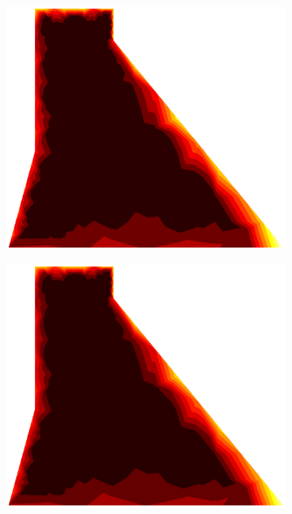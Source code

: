 \documentclass[10pt, a4paper]{article}
\begin{document}
\begin{figure}[H]
\begin{subfigure}[H]{0.19\textwidth}
		\includegraphics[width=1.2\textwidth]{fig/6.eps}
	\end{subfigure}
	\begin{subfigure}[H]{0.19\textwidth}
		\includegraphics[width=1.2\textwidth]{fig/7.eps}
	\end{subfigure}
	\begin{subfigure}[H]{0.19\textwidth}

\end{subfigure}
\end{figure}
\end{document}
